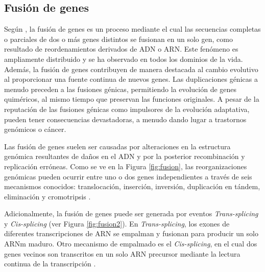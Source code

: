 \subsection{Fusión de genes}


Según \cite{williford2013gene}, la fusión de genes es un proceso mediante el cual las secuencias completas o parciales de dos o más genes distintos se fusionan en un solo gen, como resultado de reordenamientos derivados de ADN o ARN. Este fenómeno es ampliamente distribuido y se ha observado en todos los dominios de la vida. Además, la fusión de genes contribuyen de manera destacada al cambio evolutivo al proporcionar una fuente continua de nuevos genes. Las duplicaciones génicas a menudo preceden a las fusiones génicas, permitiendo la evolución de genes quiméricos, al mismo tiempo que preservan las funciones originales. A pesar de la reputación de las fusiones génicas como impulsores de la evolución adaptativa, pueden tener consecuencias devastadoras, a menudo dando lugar a trastornos genómicos o cáncer.

Las fusión de genes suelen ser causadas por alteraciones en la estructura genómica resultantes de daños en el ADN y por la posterior recombinación y replicación erróneas. Como se ve en la Figura \ref{fig:fusion}, las reorganizaciones genómicas pueden ocurrir entre uno o dos genes independientes a través de seis mecanismos conocidos: translocación, inserción, inversión, duplicación en tándem, eliminación y cromotripsis \citep{taniue2021fusion, dai2018fusion}.

Adicionalmente, la fusión de genes puede ser generada por eventos \textit{Trans-splicing} y \textit{Cis-splicing} (ver Figura \ref{fig:fusion2}). En \textit{Trans-splicing}, los exones de diferentes transcripciones de ARN se empalman y fusionan para producir un solo ARNm maduro. Otro mecanismo de empalmado es el \textit{Cis-splicing}, en el cual dos genes vecinos son transcritos en un solo ARN precursor mediante la lectura continua de la transcripción \citep{taniue2021fusion}.


